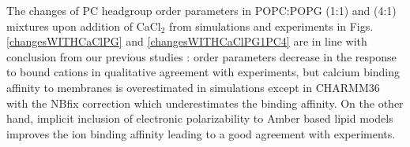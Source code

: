 \documentclass[aps,prl,superscriptaddress,twocolumn]{revtex4}
\begin{document}
The changes of PC headgroup order parameters in POPC:POPG (1:1) and (4:1) mixtures
upon addition of CaCl$_2$ from simulations and experiments \cite{borle85,macdonald87}
in Figs. \ref{changesWITHCaClPG} and \ref{changesWITHCaClPG1PC4} are in line with
conclusion from our previous studies \cite{??}:  
order parameters decrease in the response to bound cations in qualitative agreement with
experiments, but calcium binding affinity to membranes is overestimated in 
simulations except in CHARMM36 with the NBfix correction which underestimates the binding affinity.
On the other hand, implicit inclusion of electronic polarizability to Amber based lipid models
improves the ion binding affinity leading to a good agreement with experiments.
%
%
%
\end{document}
